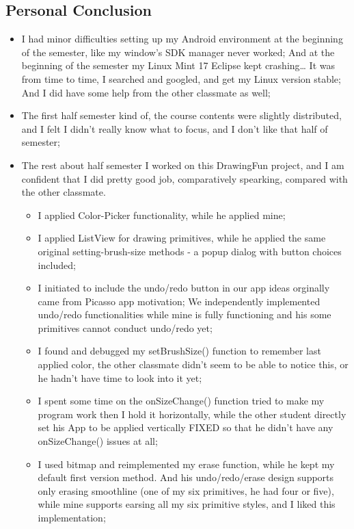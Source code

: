 \documentclass[12pt]{book}
\begin{document}
\subsection{Personal Conclusion}
\label{sec-36-2-2}
\begin{itemize}
\item I had minor difficulties setting up my Android environment at the beginning of the semester, like my window’s SDK manager never worked; And at the beginning of the semester my Linux Mint 17 Eclipse kept crashing… It was from time to time, I searched and googled, and get my Linux version stable; And I did have some help from the other classmate as well;
\item The first half semester kind of, the course contents were slightly distributed, and I felt I didn’t really know what to focus, and I don’t like that half of semester;
\item The rest about half semester I worked on this DrawingFun project, and I am confident that I did pretty good job, comparatively spearking, compared with the other classmate.
\begin{itemize}
\item I applied Color-Picker functionality, while he applied mine;
\item I applied ListView for drawing primitives, while he applied the same original setting-brush-size methods - a popup dialog with button choices included;
\item I initiated to include the undo/redo button in our app ideas orginally came from Picasso app motivation; We independently implemented undo/redo functionalities while mine is fully functioning and his some primitives cannot conduct undo/redo yet;
\item I found and debugged my setBrushSize() function to remember last applied color, the other classmate didn’t seem to be able to notice this, or he hadn’t have time to look into it yet;
\item I spent some time on the onSizeChange() function tried to make my program work then I hold it horizontally, while the other student directly set his App to be applied vertically FIXED so that he didn’t have any onSizeChange() issues at all;
\item I used bitmap and reimplemented my erase function, while he kept my default first version method. And his undo/redo/erase design supports only erasing smoothline (one of my six primitives, he had four or five), while mine supports earsing all my six primitive styles, and I liked this implementation;

\end{itemize}
\end{itemize}
\end{document}
